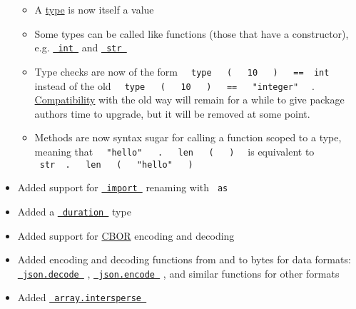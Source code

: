 \begin{itemize}
  \begin{itemize}
  \tightlist
  \item
    A \href{/docs/reference/foundations/type/}{type} is now itself a
    value
  \item
    Some types can be called like functions (those that have a
    constructor), e.g.
    \href{/docs/reference/foundations/int/}{\texttt{\ int\ }} and
    \href{/docs/reference/foundations/str/}{\texttt{\ str\ }}
  \item
    Type checks are now of the form
    \texttt{\ }{\texttt{\ type\ }}\texttt{\ }{\texttt{\ (\ }}\texttt{\ }{\texttt{\ 10\ }}\texttt{\ }{\texttt{\ )\ }}\texttt{\ }{\texttt{\ ==\ }}\texttt{\ int\ }
    instead of the old
    \texttt{\ }{\texttt{\ type\ }}\texttt{\ }{\texttt{\ (\ }}\texttt{\ }{\texttt{\ 10\ }}\texttt{\ }{\texttt{\ )\ }}\texttt{\ }{\texttt{\ ==\ }}\texttt{\ }{\texttt{\ "integer"\ }}\texttt{\ }
    .
    \href{/docs/reference/foundations/type/\#compatibility}{Compatibility}
    with the old way will remain for a while to give package authors
    time to upgrade, but it will be removed at some point.
  \item
    Methods are now syntax sugar for calling a function scoped to a
    type, meaning that
    \texttt{\ }{\texttt{\ "hello"\ }}\texttt{\ }{\texttt{\ .\ }}\texttt{\ }{\texttt{\ len\ }}\texttt{\ }{\texttt{\ (\ }}\texttt{\ }{\texttt{\ )\ }}\texttt{\ }
    is equivalent to
    \texttt{\ str\ }{\texttt{\ .\ }}\texttt{\ }{\texttt{\ len\ }}\texttt{\ }{\texttt{\ (\ }}\texttt{\ }{\texttt{\ "hello"\ }}\texttt{\ }{\texttt{\ )\ }}\texttt{\ }
  \end{itemize}
\item
  Added support for
  \href{/docs/reference/scripting/\#modules}{\texttt{\ import\ }}
  renaming with \texttt{\ as\ }
\item
  Added a
  \href{/docs/reference/foundations/duration/}{\texttt{\ duration\ }}
  type
\item
  Added support for \href{/docs/reference/data-loading/cbor/}{CBOR}
  encoding and decoding
\item
  Added encoding and decoding functions from and to bytes for data
  formats:
  \href{/docs/reference/data-loading/json/\#definitions-decode}{\texttt{\ json.decode\ }}
  ,
  \href{/docs/reference/data-loading/json/\#definitions-encode}{\texttt{\ json.encode\ }}
  , and similar functions for other formats
\item
  Added
  \href{/docs/reference/foundations/array/\#definitions-intersperse}{\texttt{\ array.intersperse\ }}

\end{itemize}
